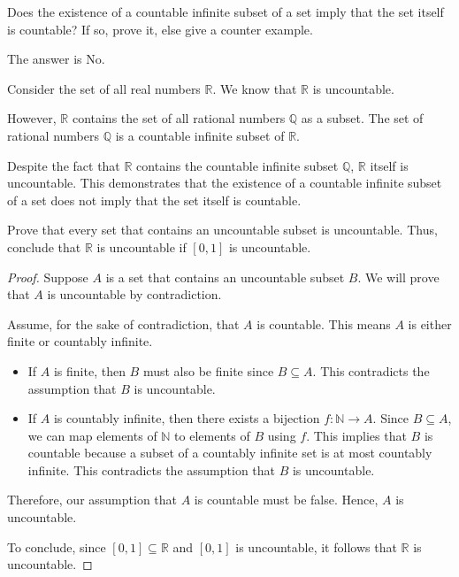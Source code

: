 \begin{exercise}
    Does the existence of a countable infinite subset of a set imply that the set itself is countable? If so, prove it, else give a counter example.
\end{exercise}
\begin{solution}
    The answer is No.

    Consider the set of all real numbers \(\mathbb{R}\). We know that \(\mathbb{R}\) is uncountable.

    However, \(\mathbb{R}\) contains the set of all rational numbers \(\mathbb{Q}\) as a subset. The set of rational numbers \(\mathbb{Q}\) is a countable infinite subset of \(\mathbb{R}\).
    
    Despite the fact that \(\mathbb{R}\) contains the countable infinite subset \(\mathbb{Q}\), \(\mathbb{R}\) itself is uncountable. This demonstrates that the existence of a countable infinite subset of a set does not imply that the set itself is countable.
\end{solution}


\begin{exercise}
    Prove that every set that contains an uncountable subset is uncountable. Thus, conclude that $\mathbb{R}$ is uncountable if $[0,1]$ is uncountable.
\end{exercise}
\begin{proof}
    Suppose $A$ is a set that contains an uncountable subset $B$. We will prove that $A$ is uncountable by contradiction.

    Assume, for the sake of contradiction, that $A$ is countable. This means $A$ is either finite or countably infinite.

    \begin{itemize}
        \item If $A$ is finite, then $B$ must also be finite since $B \subseteq A$. This contradicts the assumption that $B$ is uncountable.
        \item If $A$ is countably infinite, then there exists a bijection $f: \mathbb{N} \to A$. Since $B \subseteq A$, we can map elements of $\mathbb{N}$ to elements of $B$ using $f$. This implies that $B$ is countable because a subset of a countably infinite set is at most countably infinite. This contradicts the assumption that $B$ is uncountable.
    \end{itemize}

    Therefore, our assumption that $A$ is countable must be false. Hence, $A$ is uncountable.

    To conclude, since $[0,1] \subseteq \mathbb{R}$ and $[0,1]$ is uncountable, it follows that $\mathbb{R}$ is uncountable.
\end{proof}

